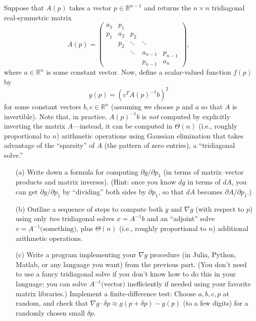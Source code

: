\begin{problem}\label{PSETexample}
Suppose that $A(p)$ takes a vector $p\in\mathbb{R}^{n-1}$ and returns
the $n\times n$ tridiagonal real-symmetric matrix
\[
A(p)=\left(\begin{array}{ccccc}
a_{1} & p_{1}\\
p_{1} & a_{2} & p_{2}\\
 & p_{2} & \ddots & \ddots\\
 &  & \ddots & a_{n-1} & p_{n-1}\\
 &  &  & p_{n-1} & a_{n}
\end{array}\right),
\]
where $a\in\mathbb{R}^{n}$ is some constant vector. Now, define
a scalar-valued function $f(p)$ by 
\[
g(p)=\left(c^{T}A(p)^{-1}b\right)^{2}
\]
for some constant vectors $b,c\in\mathbb{R}^{n}$ (assuming we choose
$p$ and $a$ so that $A$ is invertible). Note that, in practice,
$A(p)^{-1}b$ is \emph{not }computed by explicitly inverting the matrix
$A$---instead, it can be computed in $\Theta(n)$ (i.e., roughly
proportional to $n$) arithmetic operations using Gaussian elimination
that takes advantage of the ``sparsity'' of $A$ (the pattern of
zero entries), a ``tridiagonal solve.''
\begin{enumerate}
\item[(a)] Write down a formula for computing $\partial g/\partial p_{1}$ (in
terms of matrix--vector products and matrix inverses). (Hint: once
you know $dg$ in terms of $dA$, you can get $\partial g/\partial p_{1}$
by ``dividing'' both sides by $\partial p_{1}$, so that $dA$ becomes
$\partial A/\partial p_{1}$.)
\item[(b)] Outline a sequence of steps to compute both $g$ and $\nabla g$ (with
respect to $p$) using only \emph{two} tridiagonal solves $x=A^{-1}b$
and an ``adjoint'' solve $v=A^{-1}\text{(something)}$, plus $\Theta(n)$
(i.e., roughly proportional to $n$) additional arithmetic operations.
\item[(c)] Write a program implementing your $\nabla g$ procedure (in Julia,
Python, Matlab, or any language you want) from the previous part.
(You don't need to use a fancy tridiagonal solve if you don't know
how to do this in your language; you can solve $A^{-1}\text{(vector)}$
inefficiently if needed using your favorite matrix libraries.) Implement
a finite-difference test: Choose $a,b,c,p$ at random, and check that
$\nabla g\cdot\delta p\approx g(p+\delta p)-g(p)$ (to a few digits)
for a randomly chosen small $\delta p$.
\end{enumerate}
\end{problem}

